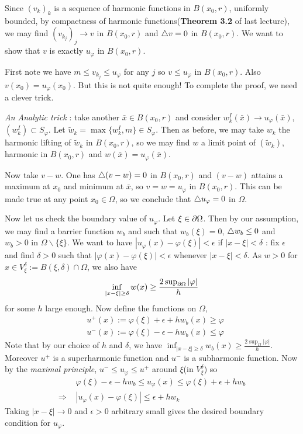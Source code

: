 \documentclass[12pt,a4paper]{article}
\newenvironment{proof}
{\begin{changemargin}{0.5cm}{0.5cm} 
	}%
	{\end{changemargin}
}
\begin{document}
\begin{proof}
Since $(v_k)_k$ is a sequence of harmonic functions in $B(x_0,r)$, uniformly bounded, by compactness of harmonic functions(\textbf{Theorem 3.2} of last lecture), we may find $(v_{k_j})_{j} \rightarrow v$ in $B(x_0, r)$ and $\triangle v =0$ in $B(x_0, r)$. We want to show that $v$ is exactly $u_{\varphi}$ in $B(x_0, r)$.

\quad First note we have $m\leq v_{k_j} \leq u_{\varphi}$ for any $j$ so $v\leq u_{\varphi}$ in $B(x_0, r)$. Also $v(x_0) = u_{\varphi}(x_0)$. But this is not quite enough! To complete the proof, we need a clever trick.
\s

\emph{An Analytic trick} : take another $\bar{x} \in B(x_0,r)$ and consider $w_k^I(\bar{x}) \rightarrow u_{\varphi}(\bar{x})$, $(w^I_k) \subset S_{\varphi}$. Let $\tilde{w}_k = \max \{w^I_k,m\} \in S_{\varphi}$. Then as before, we may take $w_k$ the harmonic lifting of $\tilde{w}_k$ in $B(x_0,r)$, so we may find $w$ a limit point of $(\tilde{w}_k)$, harmonic in $B(x_0, r)$ and $w(\bar{x}) = u_{\varphi}(\bar{x})$.
\s

Now take $v-w$. One has $\triangle (v-w) =0$ in $B(x_0, r)$ and $(v-w)$ attains a maximum at $x_0$ and minimum at $\bar{x}$, so $v=w= u_{\varphi}$ in $B(x_0 ,r)$. This can be made true at any point $x_0 \in \Omega$, so we conclude that $\triangle u_{\varphi}=0$ in $\Omega$.
\s

Now let us check the boundary value of $u_{\varphi}$. Let $\xi \in \partial \Omega$. Then by our assumption, we may find a barrier function $w_{b}$ and such that $w_b (\xi)=0$, $\triangle w_b\leq0$ and $w_{b} >0$ in $\Omega \backslash\{\xi\}$. We want to have $|u_{\varphi}(x)- \varphi(\xi)|< \epsilon$ if $|x-\xi|< \delta$ : fix $\epsilon$ and find $\delta >0$ such that $|\varphi(x) - \varphi(\xi)| < \epsilon$ whenever $|x-\xi|< \delta$. As $w>0$ for $x\in V_{\xi}^{\delta} := B(\xi, \delta) \cap \Omega$, we also have
\begin{align*}
\inf_{|x-\xi|\geq \delta} w(x) \geq \frac{2\sup_{\partial \Omega} |\varphi|}{h}
\end{align*}
for some $h$ large enough. Now define the functions on $\Omega$,
\begin{align*}
&u^+(x) := \varphi(\xi) + \epsilon + hw_b(x) \geq \varphi\\
&u^-(x) := \varphi(\xi) - \epsilon - hw_b(x) \leq \varphi
\end{align*}
Note that by our choice of $h$ and $\delta$, we have $\inf_{|x-\xi| \geq \delta} w_b(x) \geq \frac{2\sup_{\Omega} |\varphi|}{h}$. Moreover $u^+$ is a superharmonic function and $u^-$ is a subharmonic function. Now by the \emph{maximal principle}, $u^- \leq u_{\varphi} \leq u^+$ around $\xi$(in $V_{\xi}^{\delta}$) so
\begin{align*}
& \varphi(\xi) - \epsilon - hw_b \leq u_{\varphi}(x) \leq \varphi(\xi) + \epsilon + hw_b \\
\Rightarrow \,\, & |u_{\varphi}(x) - \varphi(\xi)| \leq \epsilon + hw_k
\end{align*}
Taking $|x-\xi| \rightarrow 0$ and $\epsilon>0$ arbitrary small gives the desired boundary condition for $u_{\varphi}$.

\eop
\end{proof}
\end{document}
